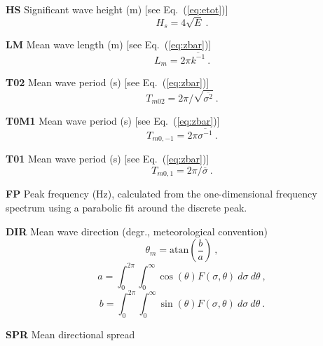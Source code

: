 \begin{list}{)\hfill}
\begin{list}{)\hfill}
            { \leftmargin 8mm 
             \rightmargin 0mm \itemsep 0mm \parsep 0mm}
\item \textbf{HS} Significant wave height (m) [see Eq.~(\ref{eq:etot})]
      \begin{equation} H_s = 4 \sqrt{E} \: . \label{eq:Hs} \end{equation}
\item \textbf{LM} Mean wave length (m) [see Eq.~(\ref{eq:zbar})]
      \begin{equation} L_m = 2\pi \overline{k^{-1}}
      \: . \label{eq:Lm} \end{equation}
\item \textbf{T02} Mean wave period (s) [see Eq.~(\ref{eq:zbar})]
      \begin{equation} T_{m02} = 2\pi /\sqrt{\overline{\sigma^{2}}}
      \: . \label{eq:Tm02} \end{equation}
\item \textbf{T0M1} Mean wave period (s) [see Eq.~(\ref{eq:zbar})]
      \begin{equation} T_{m0,-1} = 2\pi \overline{\sigma^{-1}}
      \: . \label{eq:Tm0m1} \end{equation}
\item \textbf{T01} Mean wave period (s) [see Eq.~(\ref{eq:zbar})]
      \begin{equation} T_{m0,1} = 2\pi /\overline{\sigma}
      \: . \label{eq:Tm} \end{equation}
\item \textbf{FP} Peak frequency (Hz), calculated from the one-dimensional frequency
      spectrum using a parabolic fit around the discrete peak.
\item \textbf{DIR} Mean wave direction (degr., meteorological convention)
      \begin{equation} \theta_m = \mbox{atan} \left ( \frac{b}{a} \right )
      \: , \label{eq:theta_m} \end{equation} \begin{equation}
      a = \int_0^{2\pi} \int_0^\infty \cos(\theta) F(\sigma,\theta) \:
      d\sigma \: d\theta \: , \end{equation} \begin{equation}
      b = \int_0^{2\pi} \int_0^\infty \sin(\theta) F(\sigma,\theta) \:
      d\sigma \: d\theta \: . \end{equation}
\item \textbf{SPR} Mean directional spread \citep[degr.;][]{art:KVH88}

\end{list}
\end{list}
